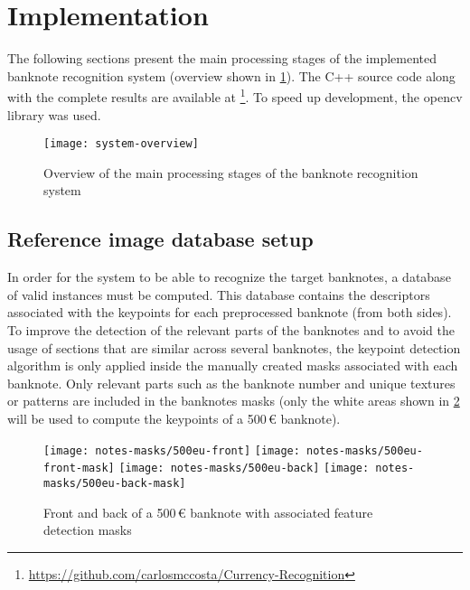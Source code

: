 \section{Implementation}\label{sec:implementation}

The following sections present the main processing stages of the implemented banknote recognition system (overview shown in \cref{fig:system-overview}). The C++ source code along with the complete results are available at \footnote{\url{https://github.com/carlosmccosta/Currency-Recognition}}. To speed up development, the \gls{opencv} library was used.

\begin{figure}[!ht]
	\centering
	\texttt{[image: system-overview]}
	\caption{Overview of the main processing stages of the banknote recognition system}
	\label{fig:system-overview}
\end{figure}


\subsection{Reference image database setup}

In order for the system to be able to recognize the target banknotes, a database of valid instances must be computed. This database contains the descriptors associated with the keypoints for each preprocessed banknote (from both sides). To improve the detection of the relevant parts of the banknotes and to avoid the usage of sections that are similar across several banknotes, the keypoint detection algorithm is only applied inside the manually created masks associated with each banknote. Only relevant parts such as the banknote number and unique textures or patterns are included in the banknotes masks (only the white areas shown in \cref{fig:banknote-feature-detection-mask-500-front} will be used to compute the keypoints of a 500\,\euro{} banknote).


\begin{figure}[H]
	\centering
	\texttt{[image: notes-masks/500eu-front]}
	\texttt{[image: notes-masks/500eu-front-mask]}
	\texttt{[image: notes-masks/500eu-back]}
	\texttt{[image: notes-masks/500eu-back-mask]}
	\caption{Front and back of a 500\,\euro{} banknote with associated feature detection masks}
	\label{fig:banknote-feature-detection-mask-500-front}
\end{figure}



